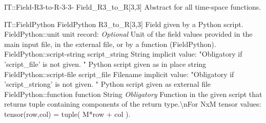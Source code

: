 \begin{AbstractType}
	{IT::Field-R3-to-R-3-3-}
	{Field{\_}R3{\_}to{\_}R[3,3]}
	{}
	{{{Abstract for all time-space functions.}%
}}
\end{AbstractType}
\begin{RecordType}
	{IT::FieldPython}
	{FieldPython}
	{}%
	{}%
	{{{R3{\_}to{\_}R[3,3] Field given by a Python script.}%
}}
		\RecKey
			{FieldPython::unit}
			{unit}
			{{record: }}{}
			{ \it{Optional}}
			{{{Unit of the field values provided in the main input file, in the external file, or by a function (FieldPython).}%
}}
		\RecKey
			{FieldPython::script-string}
			{script{\_}string}
			{{String}}{}
			{implicit value: "{Obligatory if 'script{\_}file' is not given. }"}
			{{{Python script given as in place string}%
}}
		\RecKey
			{FieldPython::script-file}
			{script{\_}file}
			{{Filename}}{}
			{implicit value: "{Obligatory if 'script{\_}striong' is not given. }"}
			{{{Python script given as external file}%
}}
		\RecKey
			{FieldPython::function}
			{function}
			{{String}}{}
			{ \it{Obligatory}}
			{{{Function in the given script that returns tuple containing components of the return type.{\textbackslash}nFor NxM tensor values: tensor(row,col) = tuple( M*row + col ).}%
}}
\end{RecordType}
